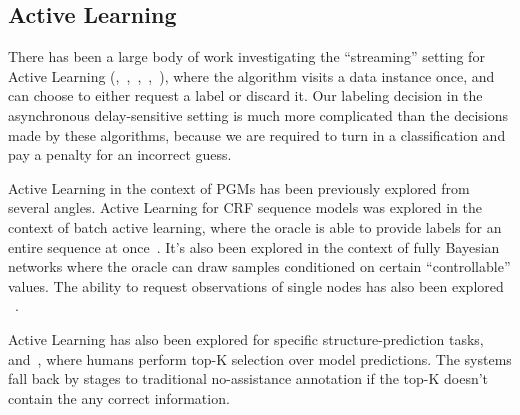 \subsection{Active Learning}

 

There has been a large body of work investigating the ``streaming'' setting for Active Learning (\cite{chu2011unbiased},~\cite{agarwal2013selective},~\cite{cheng2013feedback},~\cite{vzliobaite2011active},~\cite{helmbold1997some}), where the algorithm visits a data instance once, and can choose to either request a label or discard it.
Our labeling decision in the asynchronous delay-sensitive setting is much more complicated than the decisions made by these algorithms, because we are required to turn in a classification and pay a penalty for an incorrect guess.


Active Learning in the context of PGMs has been previously explored from several angles.
Active Learning for CRF sequence models was explored in the context of batch active learning, where the oracle is able to provide labels for an entire sequence at once~\cite{settles2008analysis}.
It's also been explored in the context of fully Bayesian networks where the oracle\cite{tong2000active} can draw samples conditioned on certain ``controllable'' values.
The ability to request observations of single nodes has also been explored ~\cite{angeli2014combining}.


Active Learning has also been explored for specific structure-prediction tasks,~\cite{roth2006active} and~\cite{culotta2005reducing}, where humans perform top-K selection over model predictions.
The systems fall back by stages to traditional no-assistance annotation if the top-K doesn't contain the any correct information.

